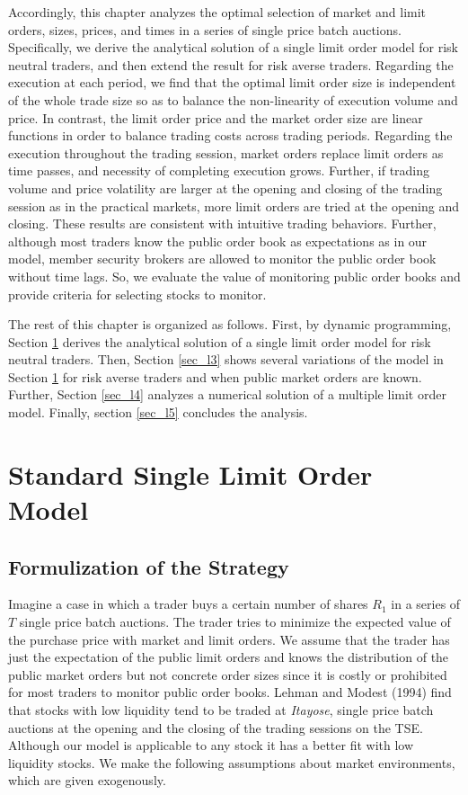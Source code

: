 Accordingly, this chapter analyzes the optimal selection of market and
limit orders, sizes, prices, and times in a series of single price batch
auctions.  Specifically, we derive the analytical solution of a single
limit order model for risk neutral traders, and then extend the result
for risk averse traders.  Regarding the execution at each period, we
find that the optimal limit order size is independent of the whole trade
size so as to balance the non-linearity of execution volume and price.
In contrast, the limit order price and the market order size are linear
functions in order to balance trading costs across trading periods.
Regarding the execution throughout the trading session, market orders
replace limit orders as time passes, and necessity of completing
execution grows.  Further, if trading volume and price volatility are
larger at the opening and closing of the trading session as in the
practical markets, more limit orders are tried at the opening and
closing.  These results are consistent with intuitive trading behaviors.
Further, although most traders know the public order book as
expectations as in our model, member security brokers are allowed to
monitor the public order book without time lags.  So, we evaluate the
value of monitoring public order books and provide criteria for
selecting stocks to monitor.

The rest of this chapter is organized as follows.  First, by dynamic programming, Section \ref{sec_l2} derives the analytical solution of a single limit order model for risk neutral traders.  Then, Section \ref{sec_l3} shows several variations of the model in Section \ref{sec_l2} for risk averse traders and when public market orders are known.  Further, Section \ref{sec_l4} analyzes a numerical solution of a multiple limit order model.  Finally, section \ref{sec_l5} concludes the analysis.

\section{Standard Single Limit Order Model}\label{sec_l2}
\subsection{Formulization of the Strategy}
Imagine a case in which a trader buys a certain number of shares $R_1$ in a series of $T$ single price batch auctions.  The trader tries to minimize the expected value of the purchase price with market and limit orders.  We assume that the trader has just the expectation of the public limit orders and knows the distribution of the public market orders but not concrete order sizes since it is costly or prohibited for most traders to monitor public order books.   Lehman and Modest (1994) find that stocks with low liquidity tend to be traded at {\it Itayose}, single price batch auctions at the opening and the closing of the trading sessions on the TSE.  Although our model is applicable to any stock it has a better fit with low liquidity stocks.  We make the following assumptions about market environments, which are given exogenously.

